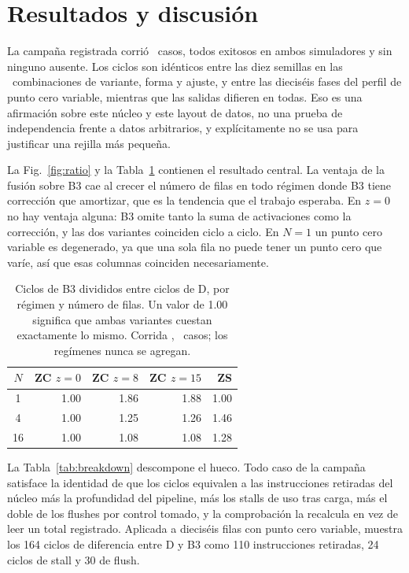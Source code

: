 \balance
\section{Resultados y discusión}
La campaña registrada corrió \CampaignCases\ casos, todos exitosos en ambos
simuladores y sin ninguno ausente. Los ciclos son idénticos entre las diez
semillas en las \CampaignCombos\ combinaciones de variante, forma y ajuste, y
entre las dieciséis fases del perfil de punto cero variable, mientras que las
salidas difieren en todas. Eso es una afirmación sobre este núcleo y este
layout de datos, no una prueba de independencia frente a datos arbitrarios, y
explícitamente no se usa para justificar una rejilla más pequeña.

La Fig.~\ref{fig:ratio} y la Tabla~\ref{tab:ratio} contienen el resultado
central. La ventaja de la fusión sobre B3 cae al crecer el número de filas en
todo régimen donde B3 tiene corrección que amortizar, que es la tendencia que el
trabajo esperaba. En \(z{=}0\) no hay ventaja alguna: B3 omite tanto la suma de
activaciones como la corrección, y las dos variantes coinciden ciclo a ciclo. En
\(N{=}1\) un punto cero variable es degenerado, ya que una sola fila no puede
tener un punto cero que varíe, así que esas columnas coinciden necesariamente.



\begin{table}[!htbp]
\caption{Ciclos de B3 divididos entre ciclos de D, por régimen y número de
filas. Un valor de 1.00 significa que ambas variantes cuestan exactamente lo
mismo. Corrida \CampaignRun, \CampaignCases\ casos; los regímenes nunca se
agregan.}
\label{tab:ratio}
\centering
\begin{tabular}{crrrr}
\hline
\(N\) & ZC \(z{=}0\) & ZC \(z{=}8\) & ZC \(z{=}15\) & ZS \\
\hline
1 & 1.00 & 1.86 & 1.88 & 1.00 \\
4 & 1.00 & 1.25 & 1.26 & 1.46 \\
16 & 1.00 & 1.08 & 1.08 & 1.28 \\
\hline
\end{tabular}
\end{table}

La Tabla~\ref{tab:breakdown} descompone el hueco. Todo caso de la campaña satisface la
identidad de que los ciclos equivalen a las instrucciones retiradas del núcleo
más la profundidad del pipeline, más los stalls de uso tras carga, más el doble
de los flushes por control tomado, y la comprobación la recalcula en vez de leer
un total registrado. Aplicada a dieciséis filas con punto cero variable, muestra
los 164 ciclos de diferencia entre D y B3 como 110 instrucciones retiradas, 24
ciclos de stall y 30 de flush.

